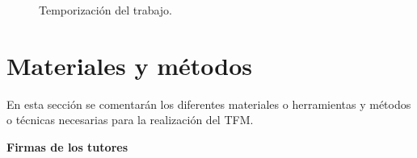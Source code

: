 \documentclass[titlepage, 12pt, a4paper, oneside]{article}
\begin{document}
\begin{figure}
  \begin{center}
  \end{center}
  \caption{Temporización del trabajo.\label{fig:temporizacion}}
\end{figure}

\section{Materiales y métodos}
En esta sección se comentarán los diferentes materiales o herramientas y métodos o técnicas necesarias para la realización del TFM.




\begin{center}
  \textbf{Firmas de los tutores}
\end{center}
\end{document}
